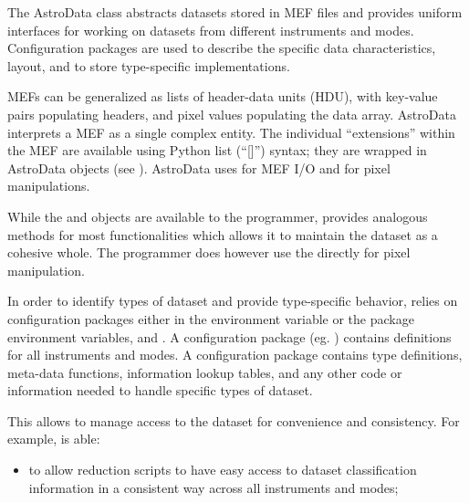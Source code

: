 \documentclass[letterpaper,10pt,english]{sphinxmanual}
\begin{document}
\begin{fulllineitems}
\label{chapter_AstroDataClass:astrodata.data.AstroData}
The AstroData class abstracts datasets stored in MEF files
and provides uniform interfaces for working on datasets from different
instruments and modes.  Configuration packages are used to describe
the specific data characteristics, layout, and to store type-specific
implementations.

MEFs can be generalized as lists of header-data units (HDU), with key-value 
pairs populating headers, and pixel values populating the data array.
AstroData interprets a MEF as a single complex entity.  The individual
``extensions'' within the MEF are available using Python list (``{[}{]}'') syntax; 
they are wrapped in AstroData objects (see 
{\hyperref[chapter_AstroDataClass:astrodata.data.AstroData.__getitem__]{}}). 
AstroData uses  for MEF I/O and  for pixel manipulations.

While the  and  objects are available to the programmer, 
 provides analogous methods for most  functionalities 
which allows it to maintain the dataset  as a cohesive whole. The programmer 
does however use the  directly for pixel manipulation.

In order to identify types of dataset and provide type-specific behavior,
 relies on configuration packages either in the  environment
variable or the  package environment variables,  and
. A configuration package (eg. ) contains definitions for
all instruments and modes. A configuration package contains type
definitions, meta-data functions, information lookup tables, and any other code
or information needed to handle specific types of dataset.

This allows  to manage access to the dataset for convenience and
consistency. For example,  is able:
\begin{itemize}
\item {} 
to allow reduction scripts to have easy access to dataset classification 
information in a consistent way across all instruments and modes;


\end{itemize}
\end{fulllineitems}
\end{document}
